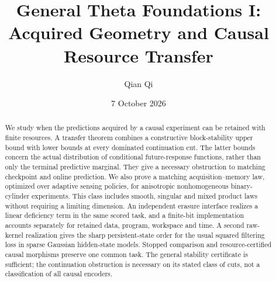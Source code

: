 \documentclass[11pt]{amsart}
\title{General Theta Foundations I:\\Acquired Geometry and Causal Resource Transfer}
\author{Qian Qi}
\date{7 October 2026}
\theoremstyle{definition}
\theoremstyle{remark}
\begin{document}
\begin{abstract}
We study when the predictions acquired by a causal experiment can be retained with finite resources. A transfer theorem combines a constructive block-stability upper bound with lower bounds at every dominated continuation cut. The latter bounds concern the actual distribution of conditional future-response functions, rather than only the terminal predictive marginal. They give a necessary obstruction to matching checkpoint and online prediction. We also prove a matching acquisition--memory law, optimized over adaptive sensing policies, for anisotropic nonhomogeneous binary-cylinder experiments. This class includes smooth, singular and mixed product laws without requiring a limiting dimension. An independent erasure interface realizes a linear deficiency term in the same scored task, and a finite-bit implementation accounts separately for retained data, program, workspace and time. A second raw-kernel realization gives the sharp persistent-state order for the usual squared filtering loss in sparse Gaussian hidden-state models. Stopped comparison and resource-certified causal morphisms preserve one common task. The general stability certificate is sufficient; the continuation obstruction is necessary on its stated class of cuts, not a classification of all causal encoders.
\end{abstract}
\maketitle






\appendix


\end{document}
